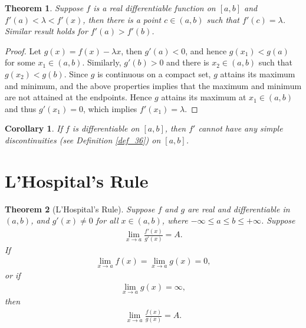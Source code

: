 \documentclass[11pt]{book}
\newtheorem{theorem}{Theorem}[chapter]
\newtheorem{corollary}{Corollary}[theorem]
\theoremstyle{definition}
\numberwithin{equation}{chapter}
\begin{document}
\medskip

\begin{theorem}
Suppose $f$ is a real differentiable function on $[a,b]$ and $f'(a) < \lambda < f'(x)$, then there is a point $c \in (a,b)$ such that $f'(c) = \lambda$. Similar result holds for $f'(a) > f'(b)$.
\end{theorem}
\begin{proof}
Let $g(x) = f(x) - \lambda x$, then $g'(a) < 0$, and hence $g(x_1) < g(a)$ for some $x_1 \in (a,b)$. Similarly, $g'(b) > 0$ and there is $x_2 \in (a,b)$ such that $g(x_2) < g(b)$. Since $g$ is continuous on a compact set, $g$ attains its maximum and minimum, and the above properties implies that the maximum and minimum are not attained at the endpoints. Hence $g$ attains its maximum at $x_1 \in (a,b)$ and thus $g'(x_1) = 0$, which implies $f'(x_1) = \lambda$.
\end{proof}

\medskip

\begin{corollary}
If $f$ is differentiable on $[a,b]$, then $f'$ cannot have any simple discontinuities (see Definition \ref{def_36}) on $[a,b]$.
\end{corollary}

\medskip







\section{L'Hospital's Rule}

\begin{theorem}[L'Hospital's Rule]\label{th_412}
Suppose $f$ and $g$ are real and differentiable in $(a,b)$, and $g'(x) \neq 0$ for all $x \in (a,b)$, where $-\infty \leq a \leq b \leq + \infty$. Suppose
\begin{align}\label{th_412_equ1}
    \lim_{x\to a} \frac{f'(x)}{g'(x)} = A.
\end{align}
If
\begin{align}\label{th_412_equ2}
    \lim_{x\to a} f(x) = \lim_{x\to a} g(x) = 0,
\end{align}
or if
\begin{align}\label{th_412_equ3}
    \lim_{x\to a} g(x) = \infty,
\end{align}
then
\begin{align}\label{th_412_equ4}
    \lim_{x\to a} \frac{f(x)}{g(x)} = A.
\end{align}
\end{theorem}
\end{document}
